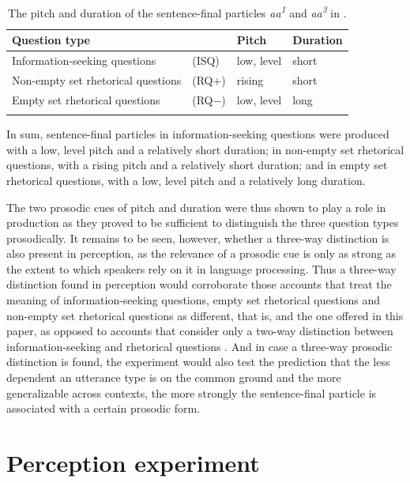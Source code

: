 \documentclass[output=paper,colorlinks,citecolor=brown            ,chinesefont]{langscibook}
\begin{document}
\begin{table}
    \centering
    \begin{tabular}{llll}
    \lsptoprule
     Question type                      &       & Pitch         & Duration \\
    \midrule
     Information-seeking questions      & (ISQ)   & low, level    & short     \\
     Non-empty set rhetorical questions & (RQ$+$) & rising        & short     \\
     Empty set rhetorical questions     & (RQ$-$) & low, level    & long      \\ \lspbottomrule
    \end{tabular}
    \caption{The pitch and duration of the sentence-final particles \textit{aa\textsuperscript{1}} and \textit{aa\textsuperscript{3}} in \citet{Lo+2019}.}
    \label{tab:Loetal}
\end{table}

In sum, sentence-final particles in information-seeking questions were produced with a low, level pitch and a relatively short duration; in non-empty set rhetorical questions, with a rising pitch and a relatively short duration; and in empty set rhetorical questions, with a low, level pitch and a relatively long duration.

The two prosodic cues of pitch and duration were thus shown to play a role in production as they proved to be sufficient to distinguish the three question types prosodically. It remains to be seen, however, whether a three-way distinction is also present in perception, as the relevance of a prosodic cue is only as strong as the extent to which speakers rely on it in language processing. Thus a three-way distinction found in perception would corroborate those accounts that treat the meaning of information-seeking questions, empty set rhetorical questions and non-empty set rhetorical questions as different, that is, \citet{Jamieson2018phd} and the one offered in this paper, as opposed to accounts that consider only a two-way distinction between information-seeking and rhetorical questions \citep{Biezma+2017}. And in case a three-way prosodic distinction is found, the experiment would also test the prediction that the less dependent an utterance type is on the common ground and the more generalizable across contexts, the more strongly the sentence-final particle is associated with a certain prosodic form.


\section{Perception experiment}
\label{sec:perception}
\end{document}
